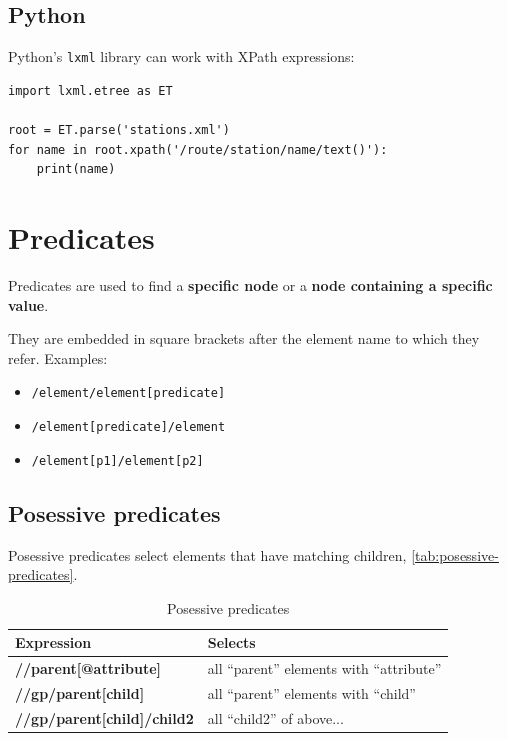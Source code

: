 \documentclass{pgnotes}
\begin{document}
\subsection{Python}

Python's \texttt{lxml} library can work with XPath expressions:
\begin{verbatim}
import lxml.etree as ET

root = ET.parse('stations.xml')
for name in root.xpath('/route/station/name/text()'):
    print(name)
\end{verbatim}



\section{Predicates}

Predicates are used to find a \textbf{specific node} or a \textbf{node containing a specific value}.

They are embedded in square brackets after the element name to which they refer.
Examples:
\begin{itemize}
\item \texttt{/element/element[predicate]}
\item \texttt{/element[predicate]/element}
\item \texttt{/element[p1]/element[p2]}
\end{itemize}


\subsection{Posessive predicates}

Posessive predicates select elements that have matching children, \autoref{tab:posessive-predicates}. 

\begin{table}[htbp]
  \centering
  \begin{tabularx}{1.0\linewidth}{l X}
    \toprule
    \textbf{Expression} & \textbf{Selects} \\
    \midrule
    \textbf{//parent[@attribute]} &  all ``parent'' elements with  ``attribute'' \\
    \textbf{//gp/parent[child]} & all ``parent'' elements with ``child'' \\
    \textbf{//gp/parent[child]/child2} &  all ``child2'' of above... \\
    \bottomrule
  \end{tabularx}
  \caption{Posessive predicates}
  \label{tab:posessive-predicates}
\end{table}
\end{document}
